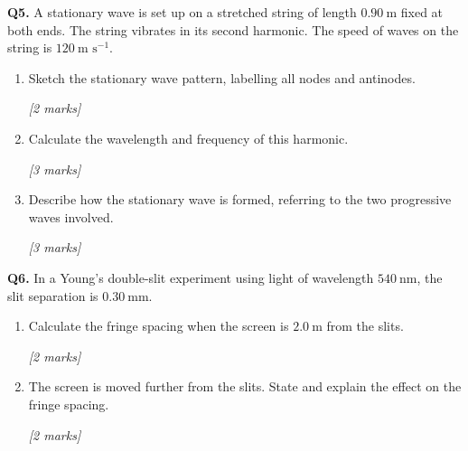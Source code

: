 \begin{tcolorbox}[colback=white, colframe=midblue, breakable]

\begin{minipage}{\linewidth}
\textbf{Q5.} A stationary wave is set up on a stretched string of length $0.90\ \text{m}$ fixed at both ends. The string vibrates in its second harmonic. The speed of waves on the string is $120\ \text{m s}^{-1}$.
\end{minipage}

\begin{enumerate}[label=(\alph*)]
  \item \begin{minipage}[t]{\linewidth}
  Sketch the stationary wave pattern, labelling all nodes and antinodes.
  \par\hfill\textit{[2 marks]}
  \vspace{4cm}
  \end{minipage}

  \item \begin{minipage}[t]{\linewidth}
  Calculate the wavelength and frequency of this harmonic.
  \par\hfill\textit{[3 marks]}
  \vspace{3.5cm}
  \end{minipage}

  \item \begin{minipage}[t]{\linewidth}
  Describe how the stationary wave is formed, referring to the two progressive waves involved.
  \par\hfill\textit{[3 marks]}
  \vspace{3.5cm}
  \end{minipage}
\end{enumerate}

\begin{minipage}{\linewidth}
\textbf{Q6.} In a Young's double-slit experiment using light of wavelength $540\ \text{nm}$, the slit separation is $0.30\ \text{mm}$.

\begin{enumerate}[label=(\alph*)]
  \item Calculate the fringe spacing when the screen is $2.0\ \text{m}$ from the slits.
  \par\hfill\textit{[2 marks]}
  \vspace{3cm}

  \item The screen is moved further from the slits. State and explain the effect on the fringe spacing.
  \par\hfill\textit{[2 marks]}
  \vspace{3cm}


\end{enumerate}
\end{minipage}
\end{tcolorbox}
